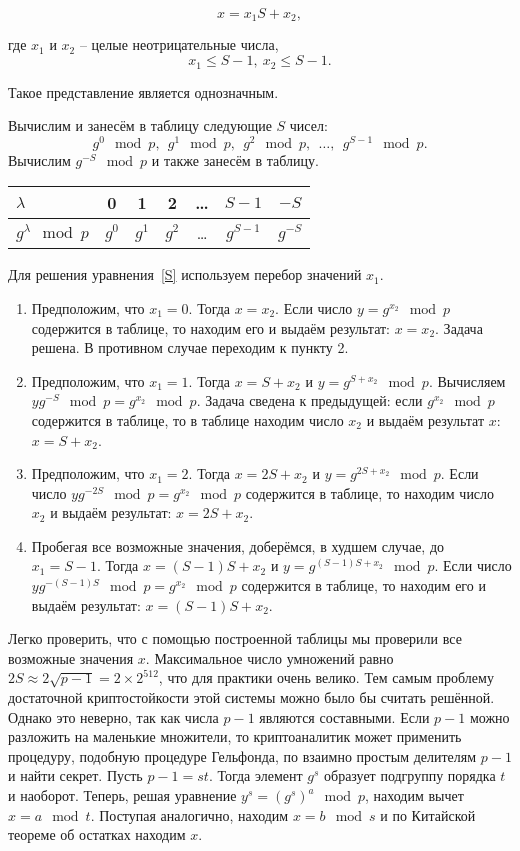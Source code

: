 \begin{equation}
    x=x_{1} S+x_{2},
    \label{S}
\end{equation}

где $x_{1}$ и $x_{2}$ -- целые неотрицательные числа,
    \[ x_{1} \le S-1, ~ x_{2} \le S-1. \]

Такое представление является однозначным.

Вычислим и занесём в таблицу следующие $S$ чисел:
    \[ g^{0} \mod p, ~~ g^{1} \mod p, ~~ g^{2} \mod p, ~~ \dots, ~~ g^{S-1} \mod p. \]
Вычислим $g^{-S} \mod p$ и также занесём в таблицу.

\begin{center} \begin{tabular}{|l|c|c|c|c|c|c|}
    \hline
    $\lambda $ & 0 & 1 & 2 & \dots & $S-1$ & $-S$ \\
    \hline
    $g^{\lambda} \mod p$ & $g^{0}$ & $g^{1}$ & $g^{2}$ & \dots & $g^{S-1}$ & $g^{-S}$ \\
    \hline
\end{tabular} \end{center}

Для решения уравнения~\ref{S} используем перебор значений $x_{1}$.
\begin{enumerate}
    \item Предположим, что $x_{1} = 0$. Тогда $x = x_{2}$. Если число $y = g^{x_{2}} \mod p$ содержится в таблице, то находим его и выдаём результат: $x=x_{2} $. Задача решена. В противном случае переходим к пункту 2.
    \item Предположим, что $x_{1} =1$. Тогда $x=S+x_{2} $ и $y=g^{S+x_{2}} \mod p$. Вычисляем $yg^{-S} \mod p=g^{x_{2}} \mod p$. Задача сведена к предыдущей: если $g^{x_{2} } \mod p$ содержится в таблице, то в таблице находим число $x_{2} $ и выдаём результат $x$: $x=S+x_{2} $.
    \item Предположим, что $x_{1} =2$. Тогда $x=2S+x_{2} $ и $y=g^{2S+x_{2} } \mod p$. Если число $yg^{-2S} \mod p=g^{x_{2} } \mod p$ содержится в таблице, то находим число $x_{2}$ и выдаём результат: $x = 2S + x_{2}$.
     \item Пробегая все возможные значения, доберёмся, в худшем случае, до $x_{1} =S-1$. Тогда $x=(S-1)S+x_{2} $ и $y = g^{(S-1)S+x_{2} } \mod p$. Если число $yg^{-(S-1)S} \mod p=g^{x_{2}} \mod p$ содержится в таблице, то находим его и выдаём результат: $x=(S-1)S+x_{2}$.
\end{enumerate}

Легко проверить, что с помощью построенной таблицы мы проверили все возможные значения $x$. Максимальное число умножений равно $2S \approx 2\sqrt{p-1} =2\times 2^{512} $, что для практики очень велико. Тем самым проблему достаточной криптостойкости этой системы можно было бы считать решённой. Однако это неверно, так как числа $p-1$ являются составными. Если $p-1$ можно разложить на маленькие множители, то криптоаналитик может применить процедуру, подобную процедуре Гельфонда, по взаимно простым делителям $p-1$ и найти секрет. Пусть $p-1=st$. Тогда элемент $g^s$ образует подгруппу порядка $t$ и наоборот. Теперь, решая уравнение $y^s=(g^s)^a\mod p$, находим вычет $x=a\mod t$. Поступая аналогично, находим $x=b\mod s$ и по Китайской теореме об остатках находим $x$.

